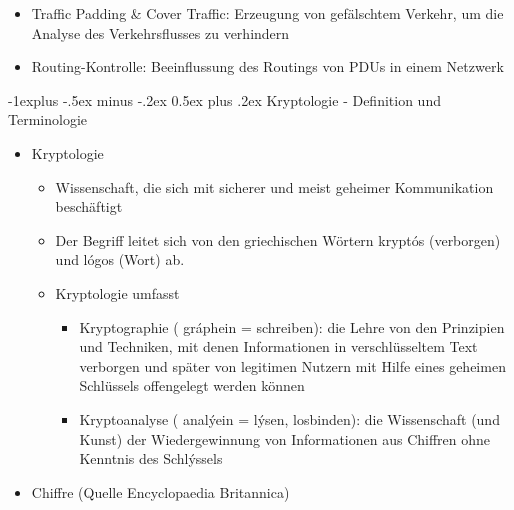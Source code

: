 \documentclass[a4paper]{article}
\makeatletter
\renewcommand{\subsection}{\@startsection{subsection}{2}{0mm}%
 {-1explus -.5ex minus -.2ex}%
 {0.5ex plus .2ex}%
 {\normalfont\normalsize\bfseries}}
\makeatother
\begin{document}
\begin{multicols}{3}
\begin{itemize}
              \begin{itemize}
                  \item
                        Traffic Padding \& Cover Traffic: Erzeugung von gefälschtem Verkehr,
                        um die Analyse des Verkehrsflusses zu verhindern
                  \item
                        Routing-Kontrolle: Beeinflussung des Routings von PDUs in einem
                        Netzwerk
              \end{itemize}
    \end{itemize}


    \subsection{Kryptologie - Definition und
        Terminologie}

    \begin{itemize}
        \item
              Kryptologie

              \begin{itemize}
                  \item
                        Wissenschaft, die sich mit sicherer und meist geheimer Kommunikation
                        beschäftigt
                  \item
                        Der Begriff leitet sich von den griechischen Wörtern kryptós
                        (verborgen) und lógos (Wort) ab.
                  \item
                        Kryptologie umfasst

                        \begin{itemize}
                            \item
                                  Kryptographie ( gráphein = schreiben): die Lehre von den
                                  Prinzipien und Techniken, mit denen Informationen in
                                  verschlüsseltem Text verborgen und später von legitimen Nutzern
                                  mit Hilfe eines geheimen Schlüssels offengelegt werden können
                            \item
                                  Kryptoanalyse ( analýein = lýsen, losbinden): die Wissenschaft
                                  (und Kunst) der Wiedergewinnung von Informationen aus Chiffren
                                  ohne Kenntnis des Schlýssels
                        \end{itemize}
              \end{itemize}
        \item
              Chiffre (Quelle Encyclopaedia Britannica)


\end{itemize}
\end{multicols}
\end{document}
